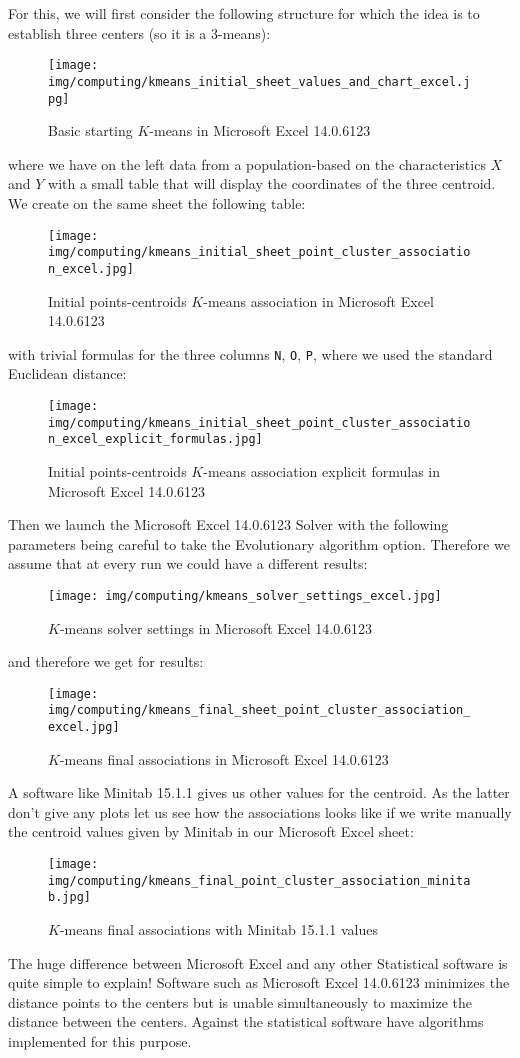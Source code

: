 	For this, we will first consider the following structure for which the idea is to establish three centers (so it is a $3$-means):
	\begin{figure}[H]
		\centering
		\texttt{[image: img/computing/kmeans\_initial\_sheet\_values\_and\_chart\_excel.jpg]}
		\caption[]{Basic starting $K$-means in Microsoft Excel 14.0.6123}
	\end{figure}
	where we have on the left data from a population-based on the characteristics $X$ and $Y$ with a small table that will display the coordinates of the three centroid. We create on the same sheet the following table:
	\begin{figure}[H]
		\centering
		\texttt{[image: img/computing/kmeans\_initial\_sheet\_point\_cluster\_association\_excel.jpg]}
		\caption[]{Initial points-centroids $K$-means association in Microsoft Excel 14.0.6123}
	\end{figure}
	with trivial formulas for the three columns \texttt{N}, \texttt{O}, \texttt{P}, where we used the standard Euclidean distance:
	\begin{figure}[H]
		\centering
		\texttt{[image: img/computing/kmeans\_initial\_sheet\_point\_cluster\_association\_excel\_explicit\_formulas.jpg]}
		\caption[]{Initial points-centroids $K$-means association explicit formulas in Microsoft Excel 14.0.6123}
	\end{figure}
	Then we launch the Microsoft Excel 14.0.6123 Solver  with the following parameters being careful to take the Evolutionary algorithm option. Therefore we assume that at every run we could have a different results:
	\begin{figure}[H]
		\centering
		\texttt{[image: img/computing/kmeans\_solver\_settings\_excel.jpg]}
		\caption[]{$K$-means solver settings in Microsoft Excel 14.0.6123}
	\end{figure}
	and therefore we get for results:
	\begin{figure}[H]
		\centering
		\texttt{[image: img/computing/kmeans\_final\_sheet\_point\_cluster\_association\_excel.jpg]}
		\caption[]{$K$-means final associations in Microsoft Excel 14.0.6123}
	\end{figure}
	A software like Minitab 15.1.1 gives us other values for the centroid. As the latter don't give any plots let us see how the associations looks like if we write manually the centroid values given by Minitab in our Microsoft Excel sheet:
	\begin{figure}[H]
		\centering
		\texttt{[image: img/computing/kmeans\_final\_point\_cluster\_association\_minitab.jpg]}
		\caption[]{$K$-means final associations with Minitab 15.1.1 values}
	\end{figure}
	The huge difference between Microsoft Excel and any other Statistical software is quite simple to explain! Software such as Microsoft Excel 14.0.6123 minimizes the distance points to the centers but is unable simultaneously to maximize the distance between the centers. Against the statistical software have algorithms implemented for this purpose.
	
